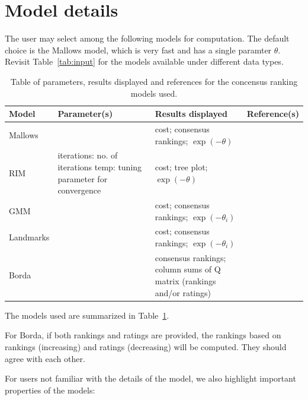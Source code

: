 \documentclass[a4paper,11pt]{memoir}
\begin{document}
\section{Model details}

The user may select among the following models for computation.
The default choice is the Mallows model, 
which is very fast and has a single paramter $\theta$.
Revisit Table~\ref{tab:input} for the models available under different data types.

\begin{table}[H]
  \centering
  \scriptsize
  \begin{tabular}{l|p{2cm}|p{6cm}|l}
    \toprule
    \textbf{Model} & \textbf{Parameter(s)} & \textbf{Results displayed} & \textbf{Reference(s)} \\
    \midrule
    Mallows &  & cost; consensus rankings; $\exp(-\theta)$ & \cite{mallows1957}\\[0.5em]
    \hline
    RIM & iterations: no. of iterations temp: tuning parameter for convergence & cost; tree plot; $\exp(-\theta)$ & \cite{meek2014rim}\\[0.5em]
    \hline
    GMM & & cost; consensus rankings; $\exp(-\theta_i)$ & \cite{fligner1986distance}\\[0.5em]
    \hline
    Landmarks & & cost; consensus rankings; $\exp(-\theta_i)$ & \\[0.5em]
    \hline
    Borda & & consensus rankings; column sums of Q matrix (rankings and/or ratings) &\\
    \bottomrule
  \end{tabular}
  \caption{Table of parameters, results displayed and references for the concensus ranking models used.}\label{tab:model}
\end{table}


The models used are summarized in Table~\ref{tab:model}.

For Borda, if both rankings and ratings are provided, the rankings based on rankings (increasing) and ratings (decreasing) will be computed.
They should agree with each other.

For users not familiar with the details of the model, we also highlight important properties of the models:
\end{document}
